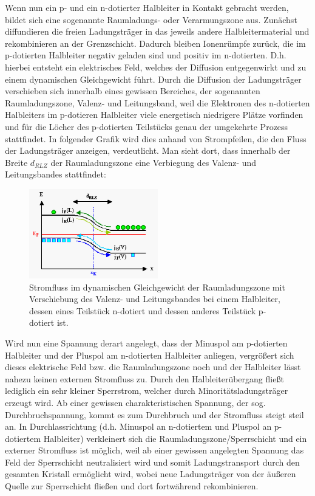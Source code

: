 \documentclass[bigchapter,colorback,accentcolor=tud4b,linedtoc,11pt]{tudreport}
\begin{document}
Wenn nun ein p- und ein n-dotierter Halbleiter in Kontakt gebracht werden, bildet sich eine sogenannte Raumladungs- oder Verarmungszone aus. Zunächst diffundieren die freien Ladungsträger in das jeweils andere Halbleitermaterial und rekombinieren an der Grenzschicht. Dadurch bleiben Ionenrümpfe zurück, die im p-dotierten Halbleiter negativ geladen sind und positiv im n-dotierten. D.h. hierbei entsteht ein elektrisches Feld, welches der Diffusion entgegenwirkt und zu einem dynamischen Gleichgewicht führt. Durch die Diffusion der Ladungsträger verschieben sich innerhalb eines gewissen Bereiches, der sogenannten Raumladungszone, Valenz- und Leitungsband, weil die Elektronen des n-dotierten Halbleiters im p-dotieren Halbleiter viele energetisch niedrigere Plätze vorfinden und für die Löcher des p-dotierten Teilstücks genau der umgekehrte Prozess stattfindet. In folgender Grafik wird dies anhand von Strompfeilen, die den Fluss der Ladungsträger anzeigen, verdeutlicht. Man sieht dort, dass innerhalb der Breite $d_{RLZ}$ der Raumladungszone eine Verbiegung des Valenz- und Leitungsbandes stattfindet:

\begin{figure}[H] 
  \centering
     \includegraphics[width=0.5\textwidth]{img/pn.jpg}
  \caption{Stromfluss im dynamischen Gleichgewicht der Raumladungszone mit Verschiebung des Valenz- und Leitungsbandes bei einem Halbleiter, dessen eines Teilstück n-dotiert und dessen anderes Teilstück p-dotiert ist. \cite{website1}}
  \label{fig:Bild1}
\end{figure}

Wird nun eine Spannung derart angelegt, dass der Minuspol am p-dotierten Halbleiter und der Pluspol am n-dotierten Halbleiter anliegen, vergrößert sich dieses elektrische Feld bzw. die Raumladungszone noch und der Halbleiter lässt nahezu keinen externen Stromfluss zu. Durch den Halbleiterübergang fließt lediglich ein sehr kleiner Sperrstrom, welcher durch Minoritätsladungsträger erzeugt wird. Ab einer gewissen charakteristischen Spannung, der sog. Durchbruchspannung, kommt es zum Durchbruch und der Stromfluss steigt steil an. In Durchlassrichtung (d.h. Minuspol an n-dotiertem und Pluspol an p-dotiertem Halbleiter) verkleinert sich die Raumladungszone/Sperrschicht und ein externer Stromfluss ist möglich, weil ab einer gewissen angelegten Spannung das Feld der Sperrschicht neutralisiert wird und somit Ladungstransport durch den gesamten Kristall ermöglicht wird, wobei neue Ladungsträger von der äußeren Quelle zur Sperrschicht fließen und dort fortwährend rekombinieren.
\end{document}
